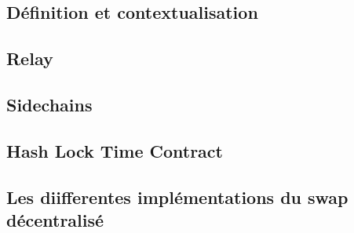 \subsection[Introduction]{Définition et contextualisation}

\subsection[Relay]{Relay}

\subsection[Sidechains]{Sidechains}

\subsection[HLTC]{Hash Lock Time Contract}

\subsection[Usages Concrets]{Les diifferentes implémentations du swap décentralisé} 
